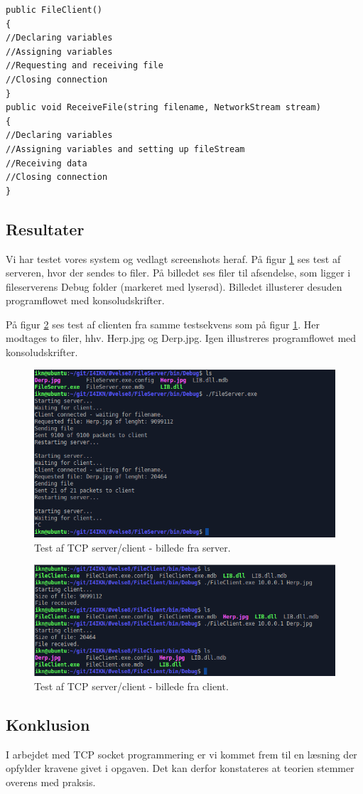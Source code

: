 \begin{lstlisting}[caption = Hoveddesign for client,label=code:tcpClient]
public FileClient()
{
//Declaring variables
//Assigning variables
//Requesting and receiving file
//Closing connection
}
public void ReceiveFile(string filename, NetworkStream stream)
{
//Declaring variables
//Assigning variables and setting up fileStream
//Receiving data
//Closing connection
}
\end{lstlisting}

\subsection{Resultater}
Vi har testet vores system og vedlagt screenshots heraf. På figur \ref{fig:tcp_h1} ses test af serveren, hvor der sendes to filer. På billedet ses filer til afsendelse, som ligger i fileserverens Debug folder (markeret med lyserød). Billedet illusterer desuden programflowet med konsoludskrifter.

På figur \ref{fig:tcp_h2} ses test af clienten fra samme testsekvens som på figur \ref{fig:tcp_h1}. Her modtages to filer, hhv. Herp.jpg og Derp.jpg. Igen illustreres programflowet med konsoludskrifter. 

\begin{figure}[H]
	\centering
	\includegraphics[width=0.9\linewidth]{figs/tcp_h1}
	\caption{Test af TCP server/client - billede fra server.}
	\label{fig:tcp_h1}
\end{figure}

\begin{figure}[H]
	\centering
	\includegraphics[width=0.9\linewidth]{figs/tcp_h2}
	\caption{Test af TCP server/client - billede fra client.}
	\label{fig:tcp_h2}
\end{figure}

\subsection{Konklusion}
I arbejdet med TCP socket programmering er vi kommet frem til en læsning der opfylder kravene givet i opgaven. Det kan derfor konstateres at teorien stemmer overens med praksis.